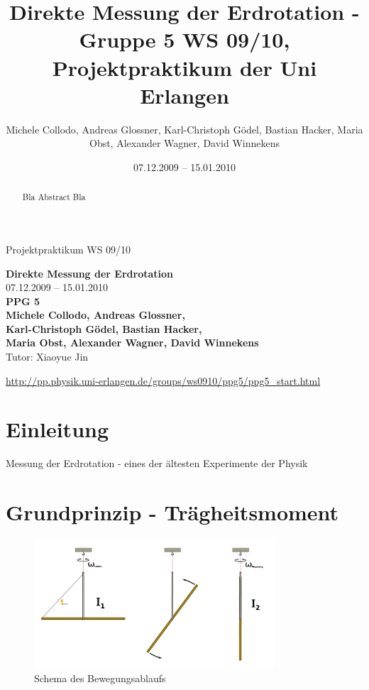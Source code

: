 \documentclass[11pt]{scrartcl}
\title{Direkte Messung der Erdrotation - Gruppe 5 WS 09/10, Projektpraktikum der Uni Erlangen}
\date{07.12.2009 -- 15.01.2010}
\author{Michele Collodo, Andreas Glossner, Karl-Christoph G\"odel, Bastian Hacker, Maria Obst, Alexander Wagner, David Winnekens}
\begin{document}
\sloppy %
\thispagestyle{empty}
\large{Projektpraktikum WS 09/10}
\hfill
{}
\\[8\baselineskip]
\begin{center}
{\fontsize{36}{54}\textbf{Direkte Messung der Erdrotation}}
\\[2\baselineskip]
{\Large 07.12.2009 -- 15.01.2010}
\\[7\baselineskip]
{\huge\textbf{PPG 5}}
\\[0.5\baselineskip]
{\large\textbf{
Michele Collodo,
Andreas Glossner,\\
Karl-Christoph G\"odel,
Bastian Hacker,\\
Maria Obst,
Alexander Wagner,
David Winnekens}\\
Tutor: Xiaoyue Jin}
\vfill



\small{\url{http://pp.physik.uni-erlangen.de/groups/ws0910/ppg5/ppg5\_start.html}}
\end{center}
\newpage



\tableofcontents
\vfill



\begin{abstract}
Bla Abstract Bla
\end{abstract}
\newpage

\section{Einleitung} %
Messung der Erdrotation - eines der \"altesten Experimente der Physik
\section{Grundprinzip - Tr\"agheitsmoment}

\begin{figure}[ht]
\begin{center}
\includegraphics[width=0.8\textwidth]{images/prinzip.pdf}
\end{center}
\vspace{-1.5\baselineskip}
\caption{Schema des Bewegungsablaufs}
\label{prinzip}
\end{figure}
\end{document}
